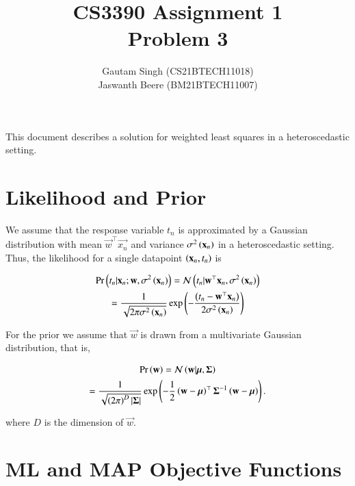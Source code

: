 \documentclass[journal,12pt,twocolumn]{IEEEtran}
\begin{document}
\vspace{3cm}
\title{CS3390 Assignment 1\\Problem 3}
\author{Gautam Singh (CS21BTECH11018)\\Jaswanth Beere (BM21BTECH11007)}
\maketitle
\tableofcontents
\bigskip

This document describes a solution for weighted least squares in a
heteroscedastic setting.

\section{Likelihood and Prior}

We assume that the response variable \(t_n\) is approximated by a Gaussian
distribution with mean \(\vec{w}^\top\vec{x_n}\) and variance
\(\sigma^2\left(\boldsymbol{\mathbf{x}}_n\right)\) in a heteroscedastic setting. Thus, the likelihood
for a single datapoint \(\left(\boldsymbol{\mathbf{x}}_n, t_n\right)\) is

\begin{multline}
     \Pr\left(t_n|\boldsymbol{\mathbf{x}}_n;\boldsymbol{\mathbf{w}},\sigma^2\left(\boldsymbol{\mathbf{x}}_n\right)\right) = \mathcal{N}\left(t_n|\boldsymbol{\mathbf{w}}^\top\boldsymbol{\mathbf{x}}_n,\sigma^2\left(\boldsymbol{\mathbf{x}}_n\right)\right) \\
                                                         = \frac{1}{\sqrt{2\pi\sigma^2\left(\boldsymbol{\mathbf{x}}_n\right)}}\exp\left(-\frac{\left(t_n-\boldsymbol{\mathbf{w}}^\top\boldsymbol{\mathbf{x}}_n\right)}{2\sigma^2\left(\boldsymbol{\mathbf{x}}_n\right)}\right)
                                                         \label{eq:likelihood}
\end{multline}

For the prior we assume that \(\vec{w}\) is drawn from a multivariate Gaussian
distribution, that is,

\begin{multline}
     \Pr\left(\boldsymbol{\mathbf{w}}\right) = \mathcal{N}\left(\boldsymbol{\mathbf{w}}|\boldsymbol{\mathbf{\mu}},\boldsymbol{\mathbf{\Sigma}}\right) \\
                  = \frac{1}{\sqrt{\left(2\pi\right)^D\left\vert\boldsymbol{\mathbf{\Sigma}}\right\vert}}\exp\left(-\frac{1}{2}\left(\boldsymbol{\mathbf{w}}-\boldsymbol{\mathbf{\mu}}\right)^\top\boldsymbol{\mathbf{\Sigma}}^{-1}\left(\boldsymbol{\mathbf{w}}-\boldsymbol{\mathbf{\mu}}\right)\right).
                  \label{eq:prior}
\end{multline}

where \(D\) is the dimension of \(\vec{w}\).

\section{ML and MAP Objective Functions}
\end{document}
